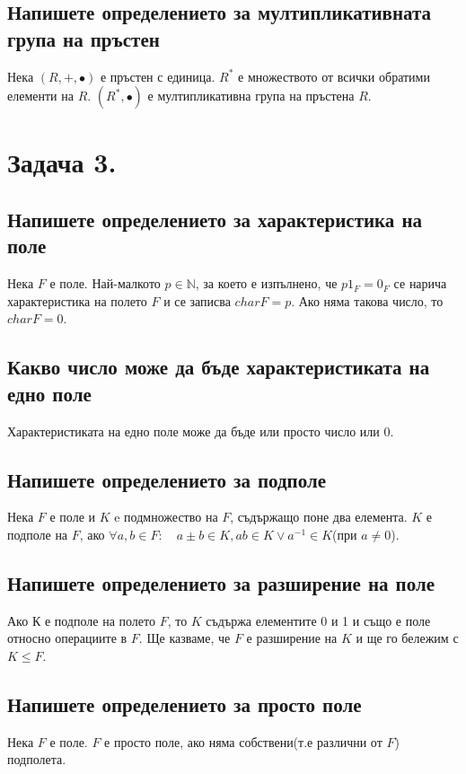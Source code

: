 \documentclass[10pt]{article}
\newcommand*{\N}{\mathbb{N}}
\begin{document}
\subsection*{Напишете определението за мултипликативната група на пръстен}
Нека $(R, +, \bullet)$ е пръстен с единица. $R^\ast$ е множеството от всички обратими елементи на $R$. $(R^\ast, \bullet)$ е мултипликативна група на пръстена $R$.

\section*{Задача 3.}

\subsection*{Напишете определението за характеристика на поле}
Нека $F$ е поле. Най-малкото $p \in \N$, за което е изпълнено, че $p1_F = 0_F$ се нарича характеристика на полето $F$ и се записва $charF = p$. Ако няма такова число, то $charF = 0$.

\subsection*{Какво число може да бъде характеристиката на едно поле}
Характеристиката на едно поле може да бъде или просто число или 0.

\subsection*{Напишете определението за подполе}
Нека $F$ е поле и $K$ e подмножество на $F$, съдържащо поне два елемента. $K$ е подполе на $F$, ако $\forall a, b \in F: \quad a \pm b \in K, ab \in K \vee a^{-1} \in K$(при $a \neq 0$).

\subsection*{Напишете определението за разширение на поле}
Ако $К$ е подполе на полето $F$, то $K$ съдържа елементите 0 и 1 и също е поле относно операциите в $F$. Ще казваме, че $F$ е разширение на $K$ и ще го бележим с $K \leq F$.

\subsection*{Напишете определението за просто поле}
Нека $F$ е поле. $F$ е просто поле, ако няма собствени(т.е различни от $F$) подполета.
\end{document}
